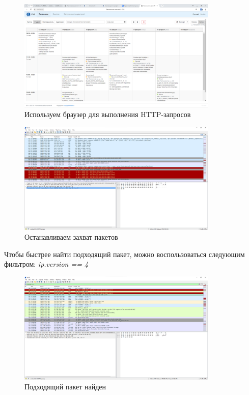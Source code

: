 \documentclass[a4paper]{article}
\begin{document}
  \begin{figure}[H]
    \centering 
    \includegraphics[width=0.85\textwidth]{03_0003}
    \caption{Используем браузер для выполнения HTTP-запросов}
    \label{img:0003}
  \end{figure}

  \begin{figure}[H]
    \centering
    \includegraphics[width=0.85\textwidth]{03_0004}
    \caption{Останавливаем захват пакетов}
    \label{img:0004}
  \end{figure}

  Чтобы быстрее найти подходящий пакет, можно воспользоваться следующим фильтром: \textit{ip.version == 4}
  \begin{figure}[H]
    \centering
    \includegraphics[width=0.85\textwidth]{03_0005}
    \caption{Подходящий пакет найден}
    \label{img:0005}
  \end{figure}
\end{document}
